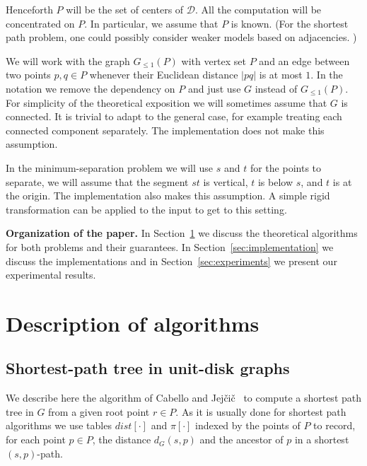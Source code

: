 \documentclass[a4paper,USenglish,numberwithinsect]{lipics}
\newcommand{\D}{\ensuremath{\mathcal{D}}}
\newcommand{\GG}{\ensuremath{G_{\le 1}}}
\def\dist{\mathit{dist}}
\let\le\leqslant
\def\myparagraph#1{\medskip\noindent\textbf{#1.}}
\begin{document}
Henceforth $P$ will be the set of centers of $\D$. 
All the computation will be concentrated on $P$. 
In particular, we assume that $P$ is known.
(For the shortest path problem, one could possibly consider weaker models based 
on adjacencies. )

We will work with the graph $\GG(P)$ with vertex set $P$ 
and an edge between two points $p,q\in P$ 
whenever their Euclidean distance $|pq|$ is at most $1$. 
In the notation we remove the dependency on $P$ and just use $G$ instead of $\GG(P)$.
For simplicity of the theoretical 
exposition we will sometimes assume that $G$ is connected.
It is trivial to adapt to the general case, for example
treating each connected component separately.
The implementation does not make this assumption.

In the minimum-separation problem we will use $s$ and $t$
for the points to separate, we will assume that
the segment $st$ is vertical, $t$ is below $s$, and $t$ is 
at the origin. The implementation also makes
this assumption. A simple rigid transformation can be applied to
the input to get to this setting.

\myparagraph{Organization of the paper} 
In Section~\ref{sec:algorithms} we discuss the theoretical
algorithms for both problems and their guarantees.
In Section~\ref{sec:implementation} we discuss the implementations 
and in Section~\ref{sec:experiments} we present our experimental results.

\section{Description of algorithms}
\label{sec:algorithms}

\subsection{Shortest-path tree in unit-disk graphs}
\label{sec:algorithm-sptree}
We describe here the algorithm of Cabello and Jej\v{c}i\v{c}~\cite{CJ15} 
to compute a shortest path tree in $G$ from a given root point $r\in P$. 
As it is usually done for shortest path algorithms 
we use tables $\dist[\cdot]$ and $\pi[\cdot]$ indexed by the points of $P$ to record, 
for each point $p\in P$, the distance $d_{G}(s,p)$ and the ancestor of $p$ 
in a shortest $(s,p)$-path. 
\end{document}

